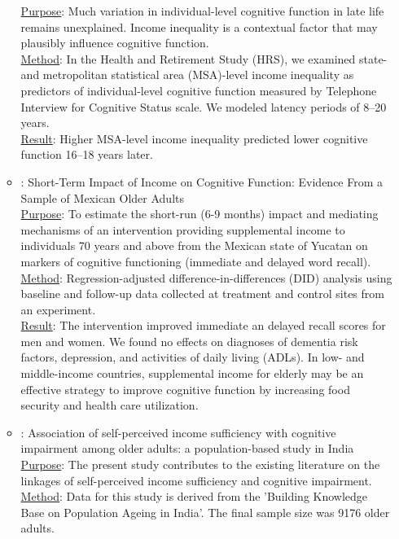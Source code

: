 \documentclass[12pt]{article}
\begin{document}
\begin{itemize}
\begin{itemize}
        \uline{Purpose}: 
        Much variation in individual-level cognitive function in late life remains unexplained. Income inequality is a contextual factor that may plausibly influence cognitive function. \\
        \uline{Method}: 
        In the Health and Retirement Study (HRS), we examined state- and metropolitan statistical area (MSA)-level income inequality as predictors of individual-level cognitive function measured by Telephone Interview for Cognitive Status scale. We modeled latency periods of 8–20 years. \\
        \uline{Result}: 
        Higher MSA-level income inequality predicted lower cognitive function 16–18 years later.
        \item \cite{aguila2020short}: Short-Term Impact of Income on Cognitive Function: Evidence From a Sample of Mexican Older Adults \\
        \uline{Purpose}: 
        To estimate the short-run (6-9 months) impact and mediating mechanisms of an intervention providing supplemental income to individuals 70 years and above from the Mexican state of Yucatan on markers of cognitive functioning (immediate and delayed word recall). \\
        \uline{Method}: 
        Regression-adjusted difference-in-differences (DID) analysis using baseline and follow-up data collected at treatment and control sites from an experiment. \\
        \uline{Result}: 
        The intervention improved immediate an delayed recall scores for men and women. We found no effects on diagnoses of dementia risk factors, depression, and activities of daily living (ADLs). In low- and middle-income countries, supplemental income for elderly may be an effective strategy to improve cognitive function by increasing food security and health care utilization.
        \item \cite{muhammad2021association}: Association of self-perceived income sufficiency with cognitive impairment among older adults: a population-based study in India \\
        \uline{Purpose}: 
        The present study contributes to the existing literature on the linkages of self-perceived income sufficiency and cognitive impairment. \\
        \uline{Method}: 
        Data for this study is derived from the 'Building Knowledge Base on Population Ageing in India'. The final sample size was 9176 older adults. \\

\end{itemize}
\end{itemize}
\end{document}
